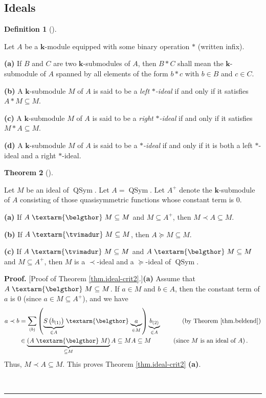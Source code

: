 \documentclass[numbers=enddot,12pt,final,onecolumn,notitlepage]{scrartcl}%
\theoremstyle{definition}
\newtheorem{theo}{Theorem}[section]
\newenvironment{theorem}[1][]
{\begin{theo}[#1]\begin{leftbar}}
{\end{leftbar}\end{theo}}
\newtheorem{defi}[theo]{Definition}
\newenvironment{definition}[1][]
{\begin{defi}[#1]\begin{leftbar}}
{\end{leftbar}\end{defi}}
\newenvironment{proof}[1][Proof]{\noindent\textbf{#1.} }{\ \rule{0.5em}{0.5em}}
\newenvironment{verlong}{}{}
\newcommand{\tvi}{\left. \textarm{\tvimadur} \right.}
\newcommand{\bel}{\left. \textarm{\belgthor} \right.}
\let\sumnonlimits\sum
\renewcommand{\sum}{\sumnonlimits\limits}
\begin{document}
\begin{verlong}
\subsection{Ideals}

\begin{definition}
Let $A$ be a $\mathbf{k}$-module equipped with some binary operation $\ast$
(written infix).

\textbf{(a)} If $B$ and $C$ are two $\mathbf{k}$-submodules of $A$, then
$B\ast C$ shall mean the $\mathbf{k}$-submodule of $A$ spanned by all elements
of the form $b\ast c$ with $b\in B$ and $c\in C$.

\textbf{(b)} A $\mathbf{k}$-submodule $M$ of $A$ is said to be a \textit{left
}$\ast$\textit{-ideal} if and only if it satisfies $A\ast M\subseteq M$.

\textbf{(c)} A $\mathbf{k}$-submodule $M$ of $A$ is said to be a \textit{right
}$\ast$\textit{-ideal} if and only if it satisfies $M\ast A\subseteq M$.

\textbf{(d)} A $\mathbf{k}$-submodule $M$ of $A$ is said to be a\textit{
}$\ast$\textit{-ideal} if and only if it is both a left $\ast$-ideal and a
right $\ast$-ideal.
\end{definition}

\begin{theorem}
\label{thm.ideal-crit2}Let $M$ be an ideal of $\operatorname*{QSym}$. Let
$A=\operatorname*{QSym}$.
Let $A^+$ denote the $\mathbf{k}$-submodule of $A$ consisting of those
quasisymmetric functions whose constant term is $0$.

\textbf{(a)} If $A\bel  M\subseteq M$ and $M \subseteq A^+$,
then $M\left.  \prec\right.  A\subseteq M$.

\textbf{(b)} If $A\tvi  M\subseteq M$, then $A\left.  \succeq\right.
M\subseteq M$.

\textbf{(c)} If $A\tvi  M\subseteq M$ and $A\bel  M\subseteq M$
and $M \subseteq A^+$, then $M$ is a
$\left.  \prec\right.  $-ideal and a $\left.  \succeq\right.  $-ideal of
$\operatorname*{QSym}$.
\end{theorem}

\begin{proof}
[Proof of Theorem \ref{thm.ideal-crit2}.]\textbf{(a)} Assume that
$A\bel  M\subseteq M$. If $a\in M$ and $b\in A$, then the constant term
of $a$ is $0$ (since $a \in M \subseteq A^+$), and we have
\begin{align*}
a\left.  \prec\right.  b  &  =\sum_{\left(  b\right)  }\left(
\underbrace{S\left(  b_{\left(  1\right)  }\right)  }_{\in A}%
\bel \underbrace{a}_{\in M}\right)  \underbrace{b_{\left(  2\right)  }}_{\in
A}\ \ \ \ \ \ \ \ \ \ \left(  \text{by Theorem \ref{thm.beldend}}\right) \\
&  \in\underbrace{\left(  A\bel M\right)  }_{\subseteq M}A\subseteq
MA\subseteq M\ \ \ \ \ \ \ \ \ \ \left(  \text{since }M\text{ is an ideal of
}A\right)  .
\end{align*}
Thus, $M\left.  \prec\right.  A\subseteq M$. This proves Theorem
\ref{thm.ideal-crit2} \textbf{(a)}.


\end{proof}
\end{verlong}
\end{document}
